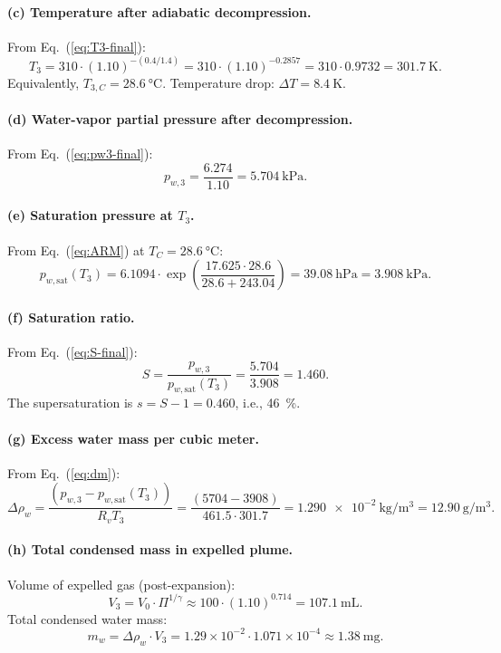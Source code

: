 \documentclass[11pt,a4paper]{article}
\newcommand{\pwsat}{p_{w,\text{sat}}}
\theoremstyle{definition}
\theoremstyle{plain}
\begin{document}
\paragraph{(c) Temperature after adiabatic decompression.}
From Eq.~(\ref{eq:T3-final}):
\[
T_3 = 310 \cdot (1.10)^{-(0.4/1.4)} = 310 \cdot (1.10)^{-0.2857} = 310 \cdot 0.9732 = \SI{301.7}{\kelvin}.
\]
Equivalently, $T_{3,C} = \SI{28.6}{\celsius}$. Temperature drop: $\Delta T = \SI{8.4}{\kelvin}$.

\paragraph{(d) Water-vapor partial pressure after decompression.}
From Eq.~(\ref{eq:pw3-final}):
\[
p_{w,3} = \frac{6.274}{1.10} = \SI{5.704}{\kilo\pascal}.
\]

\paragraph{(e) Saturation pressure at $T_3$.}
From Eq.~(\ref{eq:ARM}) at $T_C = \SI{28.6}{\celsius}$:
\[
\pwsat(T_3) = 6.1094 \cdot \exp\!\left(\frac{17.625 \cdot 28.6}{28.6 + 243.04}\right) = \SI{39.08}{\hecto\pascal} = \SI{3.908}{\kilo\pascal}.
\]

\paragraph{(f) Saturation ratio.}
From Eq.~(\ref{eq:S-final}):
\[
S = \frac{p_{w,3}}{\pwsat(T_3)} = \frac{5.704}{3.908} = 1.460.
\]
The supersaturation is $s = S - 1 = 0.460$, i.e., \SI{46}{\percent}.

\paragraph{(g) Excess water mass per cubic meter.}
From Eq.~(\ref{eq:dm}):
\[
\Delta\rho_w = \frac{(p_{w,3} - \pwsat(T_3))}{R_v T_3} = \frac{(5704 - 3908)}{461.5 \cdot 301.7} = \SI{1.290e-2}{\kilo\gram\per\cubic\meter} = \SI{12.90}{\gram\per\cubic\meter}.
\]

\paragraph{(h) Total condensed mass in expelled plume.}
Volume of expelled gas (post-expansion):
\[
V_3 = V_0 \cdot \Pi^{1/\gamma} \approx 100 \cdot (1.10)^{0.714} = \SI{107.1}{\milli\liter}.
\]
Total condensed water mass:
\[
m_w = \Delta\rho_w \cdot V_3 = 1.29 \times 10^{-2} \cdot 1.071 \times 10^{-4} \approx \SI{1.38}{\milli\gram}.
\]
\end{document}
